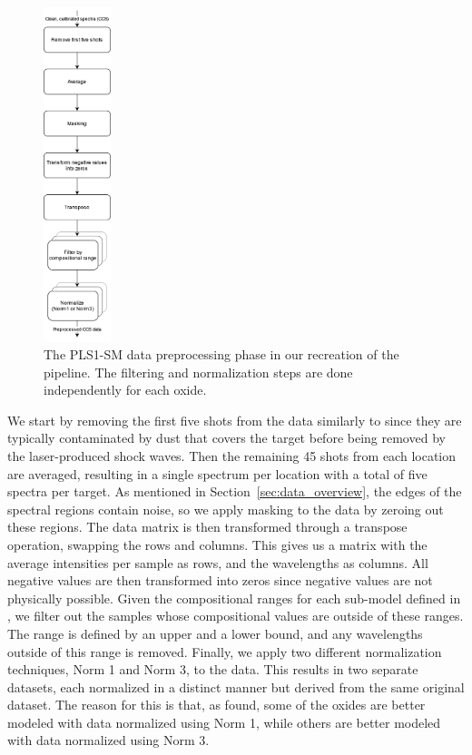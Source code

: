 \begin{figure}
	\centering
	\includegraphics[width=0.175\textwidth]{images/pls_preprocessing.png}
	\caption{The PLS1-SM data preprocessing phase in our recreation of the pipeline. The filtering and normalization steps are done independently for each oxide.}
	\label{fig:pls_data_preprocessing}
\end{figure}
\noindent
We start by removing the first five shots from the data similarly to \citet{cleggRecalibrationMarsScience2017} since they are typically contaminated by dust that covers the target before being removed by the laser-produced shock waves.
Then the remaining 45 shots from each location are averaged, resulting in a single spectrum per location with a total of five spectra per target.
As mentioned in Section~\ref{sec:data_overview}, the edges of the spectral regions contain noise, so we apply masking to the data by zeroing out these regions.
The data matrix is then transformed through a transpose operation, swapping the rows and columns.
This gives us a matrix with the average intensities per sample as rows, and the wavelengths as columns.
All negative values are then transformed into zeros since negative values are not physically possible.
Given the compositional ranges for each sub-model defined in \citet{andersonImprovedAccuracyQuantitative2017}, we filter out the samples whose compositional values are outside of these ranges.
The range is defined by an upper and a lower bound, and any wavelengths outside of this range is removed.
Finally, we apply two different normalization techniques, Norm 1 and Norm 3, to the data.
This results in two separate datasets, each normalized in a distinct manner but derived from the same original dataset.
The reason for this is that, as \citet{cleggRecalibrationMarsScience2017} found, some of the oxides are better modeled with data normalized using Norm 1, while others are better modeled with data normalized using Norm 3.

